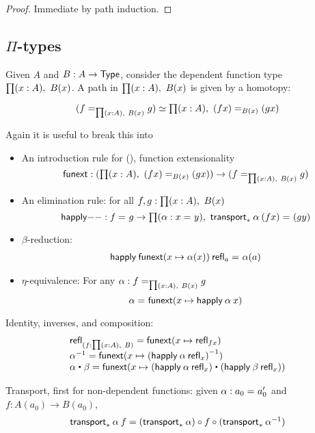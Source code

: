 \begin{proof}
Immediate by path induction.
\end{proof}

\subsection{$\Pi$-types}

Given $A$ and $B : A \to \mathsf{Type}$, consider the dependent function type $\prd{x:A}B(x)$.
A path in $\prd{x:A} B(x)$ is given by a homotopy:  

\[
\eqv{(\id[\prd{x:A} B(x)]{f}{g})}{\prd{x:A} \id[B(x)]{(f x)}{(g x)}}
\]

Again it is useful to break this into 

\begin{itemize}
\item An introduction rule for {()}, function extensionality
  \[
  \funext : (\prd{x:A} \id[B(x)]{(f x)}{(g x)}) \to {(\id[\prd{x:A} B(x)]{f}{g})}
  \]
\item An elimination rule: for all $f,g : \prd{x:A} B(x)$
  \[
  \happly{-}{-} : \id{f}{g} \to \prd{\alpha : \id{x}{y}} \id{\transport{B}{\alpha} \: {(f x)}}{(g y)}
  \]
\item $\beta$-reduction: 
  \[
  \begin{array}{l}
  \mathsf{happly} \: {\mathsf{funext}{(x \mapsto \alpha(x))}} \: {\mathsf{refl}_{a}} =_{} \alpha(a)
  \end{array}
  \]
\item $\eta$-equivalence: For any $\alpha : \id[\prd{x:A} B(x)] f g$
  \[
  \alpha =_{} \mathsf{funext} (x \mapsto \mathsf{happly} \: \alpha \: x)
  \]
\end{itemize}


Identity, inverses, and composition:
\[
\begin{array}{l}
\refl{(f : \prd{x:A} B)} = \funext(x \mapsto \refl{f x}) \\
\opp{\alpha} = \funext (x \mapsto \opp{(\happly \: {\alpha} \: {\refl x})})  \\
{\alpha} \ct \beta = \funext (x \mapsto {(\happly \: {\alpha} \: {\refl x}) \ct (\happly \: {\beta} \: {\refl x})})  \\
\end{array}
\]

\newcommand{\fcomp}{\circ}

Transport, first for non-dependent functions: given $\alpha : a_0 =_{} a_0'$
and $f : A(a_0) \to B(a_0)$, 
\[
\begin{array}{l}
\transport{x_0:A_0 \mapsto A(x_0) \to B(x_0)}{\alpha} \: f = 
   (\transport{x_0:A_0 \mapsto B(x_0)}{\alpha}) \fcomp f \fcomp (\transport{x:A_0 \mapsto A(x_0)}{\opp \alpha})
\end{array}
\]

